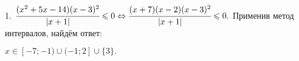 1. $\cfrac{(x^2+5x-14)(x-3)^2}{|x+1|}\leqslant0\Leftrightarrow\cfrac{(x+7)(x-2)(x-3)^2}{|x+1|}\leqslant0.$ Применив метод интервалов, найдём ответ:
\begin{figure}[ht!]
\end{figure}
$x\in[-7;-1)\cup(-1;2]\cup\{3\}.$\\
